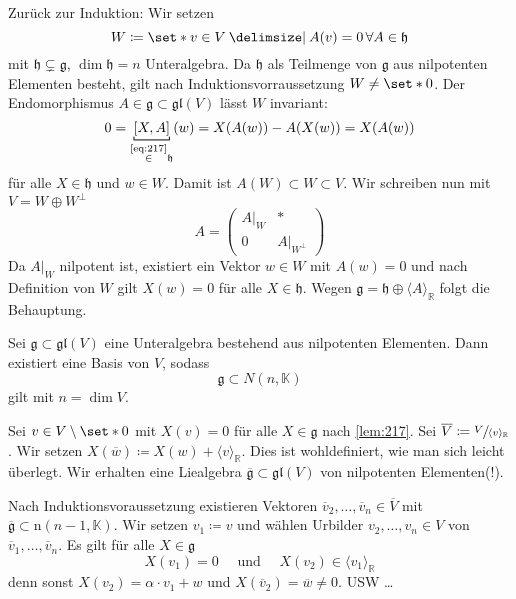 \begin{beweis}
	Zurück zur Induktion:
	Wir setzen
	\[
		W \coloneqq \set*{v \in V \given A(v)=0 \, \forall A \in \mathfrak{h}}
	\]
	mit $\mathfrak{h} \subsetneq \mathfrak{g}$, $\dim \mathfrak{h}=n$ Unteralgebra.
	Da $\mathfrak{h}$ als Teilmenge von $\mathfrak{g}$ aus nilpotenten Elementen besteht, gilt nach Induktionsvorraussetzung $W \neq \set*{0}$.
	Der Endomorphismus $A \in \mathfrak{g} \subset \mathfrak{gl}(V)$ lässt $W$ invariant:
	\[
		0 = \Underbracket{\benbrace*{X,A}}{\StackText{\eqref{eq:217}}{\in} \mathfrak{h}}(w) = X \enbrace*{A(w)} - A \enbrace*{X(w)} = X (A(w))
	\]
	für alle $X \in \mathfrak{h}$ und $w \in W$. Damit ist $A(W)\subset W \subset V$.
	Wir schreiben nun mit $V= W \oplus W^\bot$
	\[
		A = \begin{pmatrix}
			A|_W & * \\ 0 & A|_{W^\bot}
		\end{pmatrix}
	\]
	Da $A|_W$ nilpotent ist, existiert ein Vektor $w \in W$ mit $A(w)=0$ und nach Definition von $W$ gilt $X(w)=0$ für alle $X \in \mathfrak{h}$.
	Wegen $\mathfrak{g} = \mathfrak{h} \oplus \langle A \rangle_\mathbb{R}$ folgt die Behauptung.
\end{beweis}

\begin{satz}[name={Engel},label=satz:218]
	Sei $\mathfrak{g} \subset \mathfrak{gl}(V)$ eine Unteralgebra bestehend aus nilpotenten Elementen.
	Dann existiert eine Basis von $V$, sodass 
	\[
		\mathfrak{g} \subset N(n,\mathbb{K})  
	\]
	gilt mit $n = \dim V$.
\end{satz}
\begin{beweis}
	Sei $v \in V \setminus \set*{0}$ mit $X(v)=0$ für alle $X \in \mathfrak{g}$ nach \autoref{lem:217}.
	Sei $\overline{V} \coloneqq \sfrac{V}{\langle v \rangle_\mathbb{R}}$.
	Wir setzen $X(\overline{w}) \coloneqq X(w) + \langle v \rangle_\mathbb{R}$.
	Dies ist wohldefiniert, wie man sich leicht überlegt.
	Wir erhalten eine Liealgebra $\overline{\mathfrak{g}} \subset \mathfrak{gl}(V)$ von nilpotenten Elementen(!).
	
	Nach Induktionsvoraussetzung existieren Vektoren $\overline{v}_2, \ldots , \overline{v}_n \in \overline{V}$ mit $\overline{\mathfrak{g}} \subset \mathrm{n}(n-1,\mathbb{K})$.
	Wir setzen $v_1 \coloneqq v$ und wählen Urbilder $v_2, \ldots ,v_n \in V$ von $\overline{v}_1, \ldots ,\overline{v}_n$.
	Es gilt für alle $X \in \mathfrak{g}$
	\[
		X(v_1) =0 \quad \text{ und } \quad X(v_2) \in \langle v_1 \rangle_\mathbb{R}
	\]
	denn sonst $X(v_2) = \alpha \cdot v_1 + w$ und $X(\overline{v}_2)=\overline{w}\neq 0$. USW \ldots 
\end{beweis}

